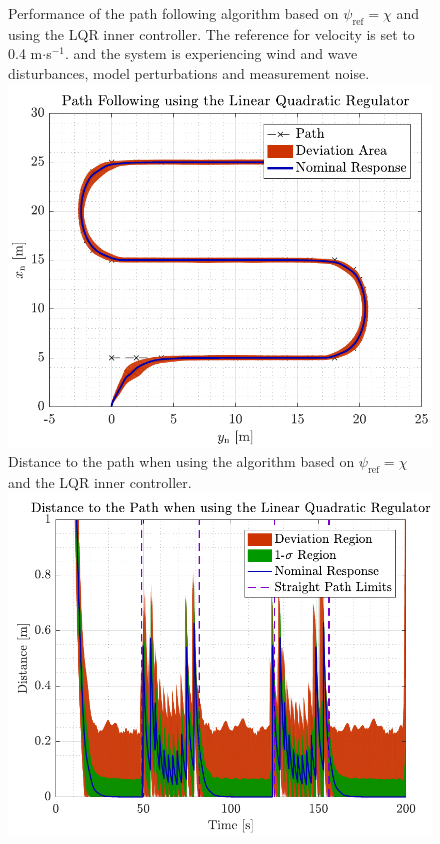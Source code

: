 \begin{figure}[H]
	\captionbox  %
	{  
		Performance of the path following algorithm based on $\psi_\mathrm{ref}=\chi$ and using the LQR inner controller. The reference for velocity is set to \num{0.4} m$\cdot$s$^{-1}$. and the system is experiencing wind and wave disturbances, model perturbations and measurement noise. \label{fig:lqrwrong}                                
	}                                                                 
	{                                                                  
		\includegraphics[width=.45\textwidth]{figures/path_lqr_no_correc}         
	}                                                                    
	\hspace{5pt}                                                  
	\captionbox
	{       
		Distance to the path when using the algorithm based on $\psi_\mathrm{ref}=\chi$ and the LQR inner controller.
		\label{fig:distlqrwrong}                               
	}                                                                  
	{                                                                    
		\includegraphics[width=.45\textwidth]{figures/dist_lqr_no_correc}         
	}                                                                         
\end{figure}
